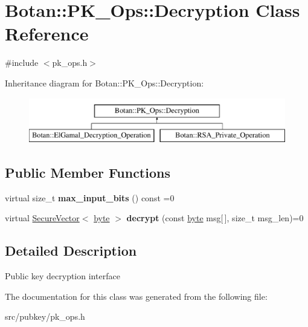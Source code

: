 \hypertarget{classBotan_1_1PK__Ops_1_1Decryption}{\section{Botan\-:\-:P\-K\-\_\-\-Ops\-:\-:Decryption Class Reference}
\label{classBotan_1_1PK__Ops_1_1Decryption}
}


{\ttfamily \#include $<$pk\-\_\-ops.\-h$>$}

Inheritance diagram for Botan\-:\-:P\-K\-\_\-\-Ops\-:\-:Decryption\-:\begin{figure}[H]
\begin{center}
\leavevmode
\includegraphics[height=2.000000cm]{classBotan_1_1PK__Ops_1_1Decryption}
\end{center}
\end{figure}
\subsection*{Public Member Functions}
\begin{DoxyCompactItemize}
\item 
\hypertarget{classBotan_1_1PK__Ops_1_1Decryption_abc2d2029e4135d2a4a6583cd2527d246}{virtual size\-\_\-t {\bfseries max\-\_\-input\-\_\-bits} () const =0}\label{classBotan_1_1PK__Ops_1_1Decryption_abc2d2029e4135d2a4a6583cd2527d246}

\item 
\hypertarget{classBotan_1_1PK__Ops_1_1Decryption_a1272301419ada398188d906c5ad32270}{virtual \hyperlink{classBotan_1_1SecureVector}{Secure\-Vector}$<$ \hyperlink{namespaceBotan_a7d793989d801281df48c6b19616b8b84}{byte} $>$ {\bfseries decrypt} (const \hyperlink{namespaceBotan_a7d793989d801281df48c6b19616b8b84}{byte} msg\mbox{[}$\,$\mbox{]}, size\-\_\-t msg\-\_\-len)=0}\label{classBotan_1_1PK__Ops_1_1Decryption_a1272301419ada398188d906c5ad32270}

\end{DoxyCompactItemize}


\subsection{Detailed Description}
Public key decryption interface 

The documentation for this class was generated from the following file\-:\begin{DoxyCompactItemize}
\item 
src/pubkey/pk\-\_\-ops.\-h\end{DoxyCompactItemize}

